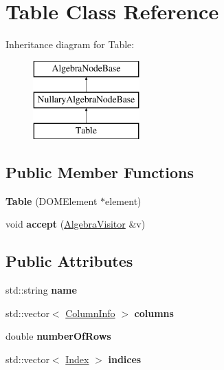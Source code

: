 \hypertarget{class_table}{\section{Table Class Reference}
\label{class_table}
}
Inheritance diagram for Table\+:\begin{figure}[H]
\begin{center}
\leavevmode
\includegraphics[height=3.000000cm]{class_table}
\end{center}
\end{figure}
\subsection*{Public Member Functions}
\begin{DoxyCompactItemize}
\item 
\hypertarget{class_table_ab2c4d8adebfd7136e19d843c8bcf44c3}{{\bfseries Table} (D\+O\+M\+Element $\ast$element)}\label{class_table_ab2c4d8adebfd7136e19d843c8bcf44c3}

\item 
\hypertarget{class_table_a4496e1f66e8faa9b4fcf5c115a9b16f3}{void {\bfseries accept} (\hyperlink{class_algebra_visitor}{Algebra\+Visitor} \&v)}\label{class_table_a4496e1f66e8faa9b4fcf5c115a9b16f3}

\end{DoxyCompactItemize}
\subsection*{Public Attributes}
\begin{DoxyCompactItemize}
\item 
\hypertarget{class_table_a776e2cab59507b3b59d475a964e347b8}{std\+::string {\bfseries name}}\label{class_table_a776e2cab59507b3b59d475a964e347b8}

\item 
\hypertarget{class_table_ad6e2d1b269aa5c182e0357b75f46eee0}{std\+::vector$<$ \hyperlink{class_column_info}{Column\+Info} $>$ {\bfseries columns}}\label{class_table_ad6e2d1b269aa5c182e0357b75f46eee0}

\item 
\hypertarget{class_table_ae85736953b357d0d44a50fd4a47de796}{double {\bfseries number\+Of\+Rows}}\label{class_table_ae85736953b357d0d44a50fd4a47de796}

\item 
\hypertarget{class_table_a985077d6ec6eacb7828b78b9b9bc6157}{std\+::vector$<$ \hyperlink{class_index}{Index} $>$ {\bfseries indices}}\label{class_table_a985077d6ec6eacb7828b78b9b9bc6157}

\end{DoxyCompactItemize}


